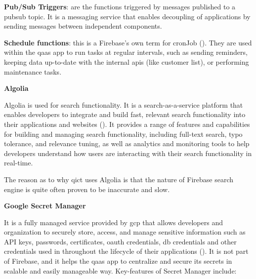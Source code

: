 \begin{multicols}{2}
      \textbf{Pub/Sub Triggers}: are the functions triggered by messages published to a \acrshort{pubsub} topic.
      It is a messaging service that enables decoupling of applications by sending messages between independent components.

      \textbf{Schedule functions}: this is a Firebase's own term for \gls{cronJob} (\textit{\cite{scheduleFunction}}).
      They are used within the \acrshort{qaas} app to run tasks at regular intervals, such as sending reminders, keeping
      data up-to-date with the internal \acrshort{api}s (like customer list), or performing maintenance tasks.

      \textbf{Algolia}

      Algolia is used for search functionality. It is a search-as-a-service platform that enables developers to
      integrate and build fast, relevant search functionality into their applications and websites
      (\textit{\cite{algolia}}). It provides a range of features and capabilities for building and managing search
      functionality, including full-text search, typo tolerance, and relevance tuning, as well as analytics and
      monitoring tools to help developers understand how users are interacting with their search functionality in
      real-time.

      The reason as to why \acrshort{qict} uses Algolia is that the nature of Firebase search engine is quite often
      proven to be inaccurate and slow.

      \textbf{Google Secret Manager}

      It is a fully managed service provided by \acrshort{gcp} that allows developers and organization to securely store,
      access, and manage sensitive information such as API keys, passwords, certificates, \acrshort{oauth} credentials,
      \acrshort{db} credentials and other credentials used in throughout the lifecycle of their applications
      (\textit{\cite{googlesecretmanager}}). It is not part of Firebase, and it helps the \acrshort{qaas} app to centralize and
      secure its secrets in scalable and easily manageable way. Key-features of Secret Manager include:


\end{multicols}
